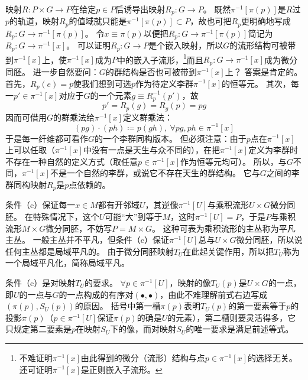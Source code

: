 \begin{note}
    映射$R \colon P \times G \to P$在给定$p \in P$后诱导出映射$R_p \colon G \to P$。
    既然$\pi^{-1}[\pi(p)]$是$R$过$p$的轨道，映射$R_p$的值域就只能是$\pi^{-1}[\pi(p)] \subset P$，故也可把$R_p$更明确地写成$R_p \colon G \to \pi^{-1}[\pi(p)]$。
    令$x \equiv \pi(p)$以便把$R_p \colon G \to \pi^{-1}[\pi(p)]$简记为$R_p \colon G \to \pi^{-1}[x]$。
    可以证明$R_p \colon G \to P$是个嵌入映射，所以$G$的流形结构可被带到$\pi^{-1}[x]$上，使$\pi^{-1}[x]$成为$P$中的嵌入子流形，\footnote{
        不难证明$\pi^{-1}[x]$由此得到的微分（流形）结构与点$p \in \pi^{-1}[x]$的选择无关。
        还可证明$\pi^{-1}[x]$是正则嵌入子流形。
    }而且$R_p \colon G \to \pi^{-1}[x]$成为微分同胚。
    进一步自然要问：$G$的群结构是否也可被带到$\pi^{-1}[x]$上？
    答案是肯定的。
    首先，$R_p(e) = p$使我们想到可选$p$作为待定义李群$\pi^{-1}[x]$的恒等元。
    其次，每一$p' \in \pi^{-1}[x]$对应于$G$的一个元素$g \equiv R_p^{-1}(p')$，故
    $$p' = R_p(g) = R_g(p) = pg$$
    因而可借用$G$的群乘法给$\pi^{-1}[x]$定义群乘法：
    $$(pg)\cdot(ph) \coloneq p(gh), ~ \forall pg, ph \in \pi^{-1}[x]$$
    于是每一纤维都可看作$G$的一个李群同构版本。
    但必须注意：由于$p$点在$\pi^{-1}[x]$上可以任取（$\pi^{-1}[x]$中没有一点是天生与众不同的），在把$\pi^{-1}[x]$定义为李群时不存在一种自然的定义方式（取任意$p \in \pi^{-1}[x]$作为恒等元均可）。
    所以，与$G$不同，$\pi^{-1}[x]$不是一个自然的李群，或说它不存在天生的群结构。
    它与$G$之间的李群同构映射$R_p$是$p$点依赖的。
\end{note}

\begin{note}
    条件（c）保证每一$x \in M$都有开邻域$U$，其逆像$\pi^{-1}[U]$与乘积流形$U \times G$微分同胚。
    在特殊情况下，这个$U$可能``大''到等于$M$，这时$\pi^{-1}[U] = P$，于是$P$与乘积流形$M \times G$微分同胚，不妨写$P = M \times G$。
    这种可表为乘积流形的主丛称为平凡主丛。
    一般主丛并不平凡，但条件（c）保证$\pi^{-1}[U]$总与$U \times G$微分同胚，所以说任何主丛都是局域平凡的。
    由于微分同胚映射$T_U$在此起关键作用，所以把$T_U$称为一个局域平凡化，简称局域平凡。
\end{note}

\begin{note}
    条件（c）是对映射$T_U$的要求。
    $\forall p \in \pi^{-1}[U]$，映射的像$T_U(p)$是$U \times G$的一点，即$U$的一点与$G$的一点构成的有序对$(\bullet, \bullet)$，由此不难理解前式右边写成$(\pi(p), S_U(p))$的原因。
    括号中第一槽$\pi(p)$表明$T_U(p)$的第一要素等于$p$的投影$\pi(p)$（$p \in \pi^{-1}[U]$保证$\pi(p)$的确是$U$的元素），第二槽则要灵活得多，它只规定第二要素是$p$在映射$S_U$下的像，而对映射$S_U$的唯一要求是满足前述等式。
\end{note}

